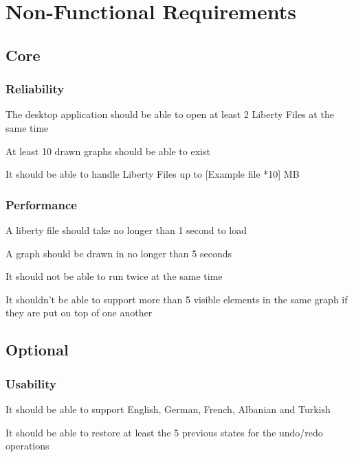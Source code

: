 \documentclass[10pt,a4paper]{report}
\begin{document}
\section{Non-Functional Requirements}
\subsection{Core}
\subsubsection{Reliability}
\begin{NFR-Rel}
    \item The desktop application should be able to open at least 2 Liberty Files at the same time
    \item At least 10 drawn graphs should be able to exist
    \item It should be able to handle Liberty Files up to [Example file *10] MB
\end{NFR-Rel}

\subsubsection{Performance}
\begin{NFR-Perf}
    \item A liberty file should take no longer than 1 second to load
    \item A graph should be drawn in no longer than 5 seconds
    \item It should not be able to run twice at the same time
    \item It shouldn’t be able to support more than 5 visible elements in the same graph if they are put on top of one another
\end{NFR-Perf}

\subsection{Optional}
\subsubsection{Usability}
\begin{NFRO-Usability}
    \item It should be able to support English, German, French, Albanian and Turkish
    \item It should be able to restore at least the 5 previous states for the undo/redo operations 
\end{NFRO-Usability}
\end{document}
